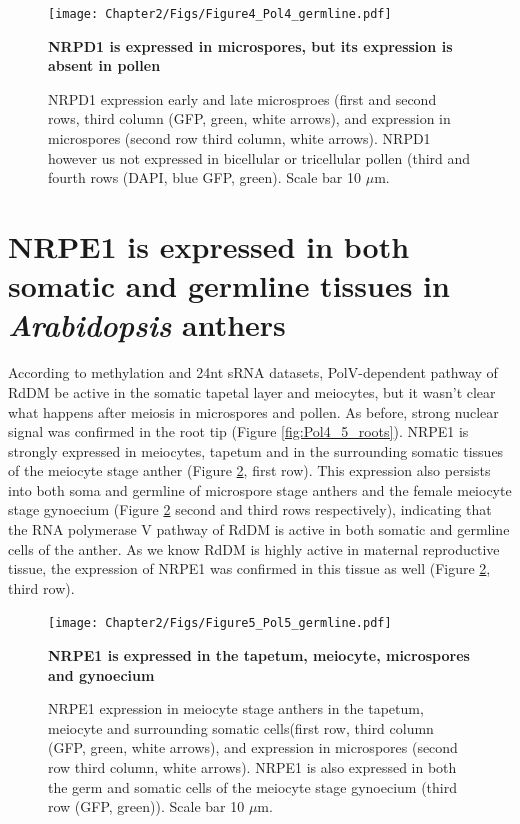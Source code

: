 \begin{figure}[htbp!] 
\centering    
    \texttt{[image: Chapter2/Figs/Figure4\_Pol4\_germline.pdf]}
\caption{\textbf{NRPD1 is expressed in microspores, but its expression is absent in pollen}}
\label{fig:Pol4_germ}
\captionsetup{font=small}
    \caption*{NRPD1 expression early and late microsproes (first and second rows, third column (GFP, green, white arrows), and expression in microspores (second row third column, white arrows). NRPD1 however us not expressed in bicellular or tricellular pollen (third and fourth rows (DAPI, blue GFP, green). Scale bar 10 $\mu$m.}
\end{figure}

\section{NRPE1 is expressed in both somatic and germline tissues in \textit{Arabidopsis} anthers}

According to methylation and 24nt sRNA datasets,  PolV-dependent pathway of RdDM be active in the somatic tapetal layer and meiocytes, but it wasn't clear what happens after meiosis in microspores and pollen. As before, strong nuclear signal was confirmed in the root tip (Figure \ref{fig:Pol4_5_roots}).  NRPE1 is strongly expressed in meiocytes, tapetum and in the surrounding somatic tissues of the meiocyte stage anther (Figure \ref{fig:Pol5_germ}, first row). This expression also persists into both soma and germline of microspore stage anthers and the female meiocyte stage gynoecium (Figure \ref{fig:Pol5_germ} second and third rows respectively), indicating that the RNA polymerase V pathway of RdDM is active in both somatic and germline cells of the anther. As we know RdDM is highly active in maternal reproductive tissue, the expression of NRPE1 was confirmed in this tissue as well (Figure \ref{fig:Pol5_germ}, third row).

\begin{figure}[htbp!] 
\centering    
    \texttt{[image: Chapter2/Figs/Figure5\_Pol5\_germline.pdf]}
\caption{\textbf{NRPE1 is expressed in the tapetum, meiocyte, microspores and gynoecium}}
\label{fig:Pol5_germ}
\captionsetup{font=small}
    \caption*{NRPE1 expression in meiocyte stage anthers in the tapetum, meiocyte and surrounding somatic cells(first row, third column (GFP, green, white arrows), and expression in microspores (second row third column, white arrows). NRPE1 is also expressed in both the germ and somatic cells of the meiocyte stage gynoecium (third row (GFP, green)). Scale bar 10 $\mu$m.}
\end{figure}


